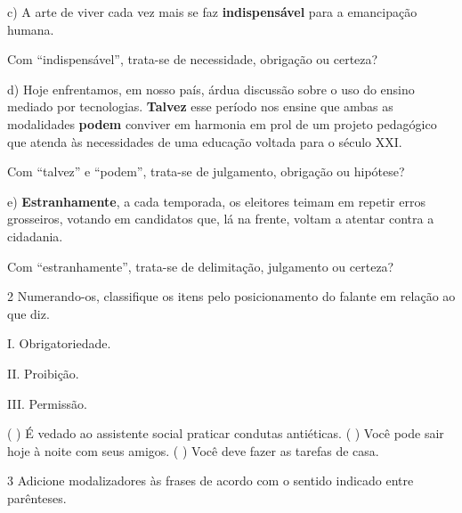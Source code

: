 
c) A arte de viver cada vez mais se faz \textbf{indispensável} para a
emancipação humana.

Com ``indispensável'', trata-se de necessidade, obrigação ou certeza?


d) Hoje enfrentamos, em nosso país, árdua discussão sobre o uso do
ensino mediado por tecnologias. \textbf{Talvez} esse período nos ensine
que ambas as modalidades \textbf{podem} conviver em harmonia em prol de
um projeto pedagógico que atenda às necessidades de uma educação voltada
para o século XXI.

Com ``talvez'' e ``podem'', trata-se de julgamento, obrigação ou hipótese?


e) \textbf{Estranhamente}, a cada temporada, os eleitores teimam em
repetir erros grosseiros, votando em candidatos que, lá na frente,
voltam a atentar contra a cidadania.

Com ``estranhamente'', trata-se de delimitação, julgamento ou certeza?


\num{2} Numerando-os, classifique os itens pelo posicionamento do
falante em relação ao que diz.

\begin{multicols}{2}

I. Obrigatoriedade. 

II. Proibição. 

III. Permissão.

\columnbreak

(  ) É vedado ao assistente social praticar condutas
antiéticas. 
(  ) Você pode sair hoje à noite com seus
amigos. 
(  ) Você deve fazer as tarefas de casa.
\end{multicols}

\num{3} Adicione modalizadores às frases de acordo com o sentido
indicado entre parênteses.

